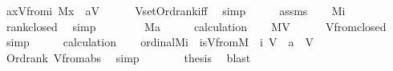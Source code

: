 \begin{isabellebody}
\ {\isachardoublequoteopen}a{\isasymin}{\isacharbraceleft}{\kern0pt}x{\isasymin}Vfrom{\isacharparenleft}{\kern0pt}{}{\isacharcomma}{\kern0pt}{\isacharquery}{\kern0pt}i{\isacharparenright}{\kern0pt}{\isachardot}{\kern0pt}\ M{\isacharparenleft}{\kern0pt}x{\isacharparenright}{\kern0pt}{\isacharbraceright}{\kern0pt}{\isachardoublequoteclose}\ {\isacharparenleft}{\kern0pt}\ {\isachardoublequoteopen}a{\isasymin}{\isacharquery}{\kern0pt}V{\isachardoublequoteclose}{\isacharparenright}{\kern0pt}\isanewline
\ \ \ \ \isamarkupfalse%
\ Vset{\isacharunderscore}{\kern0pt}Ord{\isacharunderscore}{\kern0pt}rank{\isacharunderscore}{\kern0pt}iff\ \isamarkupfalse%
\ simp\isanewline
\ \ \isamarkupfalse%
\ \isamarkupfalse%
\ assms\isanewline
\ \ \isamarkupfalse%
\ {\isachardoublequoteopen}M{\isacharparenleft}{\kern0pt}{\isacharquery}{\kern0pt}i{\isacharparenright}{\kern0pt}{\isachardoublequoteclose}\isanewline
\ \ \ \ \isamarkupfalse%
\ rank{\isacharunderscore}{\kern0pt}closed\ \isamarkupfalse%
\ simp\isanewline
\ \ \isamarkupfalse%
\ \isanewline
\ \ \isamarkupfalse%
\ {\isacartoucheopen}M{\isacharparenleft}{\kern0pt}a{\isacharparenright}{\kern0pt}{\isacartoucheclose}\isanewline
\ \ \isamarkupfalse%
\ \isamarkupfalse%
\ calculation\isanewline
\ \ \isamarkupfalse%
\ {\isachardoublequoteopen}M{\isacharparenleft}{\kern0pt}{\isacharquery}{\kern0pt}V{\isacharparenright}{\kern0pt}{\isachardoublequoteclose}\isanewline
\ \ \ \ \isamarkupfalse%
\ Vfrom{\isacharunderscore}{\kern0pt}closed\ \isamarkupfalse%
\ simp\isanewline
\ \ \isamarkupfalse%
\ \isamarkupfalse%
\ calculation\isanewline
\ \ \isamarkupfalse%
\ {\isachardoublequoteopen}ordinal{\isacharparenleft}{\kern0pt}M{\isacharcomma}{\kern0pt}{\isacharquery}{\kern0pt}i{\isacharparenright}{\kern0pt}\ {\isasymand}\ is{\isacharunderscore}{\kern0pt}Vfrom{\isacharparenleft}{\kern0pt}M{\isacharcomma}{\kern0pt}\ {}{\isacharcomma}{\kern0pt}\ {\isacharquery}{\kern0pt}i{\isacharcomma}{\kern0pt}\ {\isacharquery}{\kern0pt}V{\isacharparenright}{\kern0pt}\ {\isasymand}\ a\ {\isasymin}\ {\isacharquery}{\kern0pt}V{\isachardoublequoteclose}\isanewline
\ \ \ \ \isamarkupfalse%
\ Ord{\isacharunderscore}{\kern0pt}rank\ Vfrom{\isacharunderscore}{\kern0pt}abs\ \isamarkupfalse%
\ simp\ \isanewline
\ \ \isamarkupfalse%
\isanewline
\ \ \isamarkupfalse%
\ {\isacharquery}{\kern0pt}thesis\ \isamarkupfalse%
\ blast\isanewline
{}\isamarkupfalse%
%
\endisatagproof
{\isafoldproof}%
%
\isadelimproof
\isanewline
%
\endisadelimproof
\isanewline
{}\isamarkupfalse%
\isanewline
%
\isadelimtheory
%
\endisadelimtheory
%
\isatagtheory
{}\isamarkupfalse%
%
\endisatagtheory
{\isafoldtheory}%
%
\isadelimtheory
%
\endisadelimtheory
%
\end{isabellebody}%
